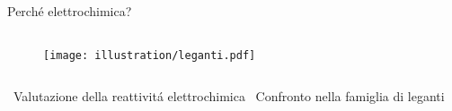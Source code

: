 \documentclass[aspectration=169]{beamer}
\newcommand{\B}{\textcolor{maincolor}{\textbullet}}
\begin{document}
\begin{frame}{Perché elettrochimica?}
\begin{columns}
\begin{column}{0.5\textwidth}
			\vspace{-2cm}
			\begin{center}
				\begin{figure}[h!]
					\centering
					\texttt{[image: illustration/leganti.pdf]}
				\end{figure}
			\end{center}
		\end{column}
	\end{columns}
	\vspace{0.5cm}
	\centering
	\B \ Valutazione della reattivitá elettrochimica \hspace{1cm} \B \ Confronto nella famiglia di leganti
\end{frame}

\end{document}
